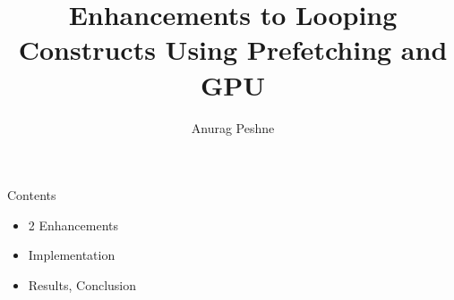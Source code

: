 \documentclass[pdf]{beamer}
\title{Enhancements to Looping Constructs Using Prefetching and GPU}
\author{Anurag Peshne}
\begin{document}
\begin{frame}
  \titlepage
\end{frame}

\begin{frame}{Contents}
  \pause
  \begin{itemize}
    \item 2 Enhancements
    \pause
    \item Implementation
    \pause
    \item Results, Conclusion
  \end{itemize}
\end{frame}
\end{document}
